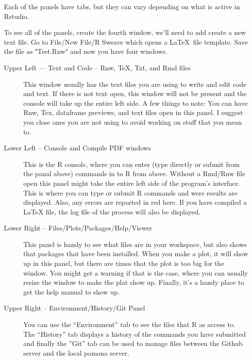 \documentclass[12pt]{../SOP4_alpha}\usepackage[]{graphicx}\usepackage[]{color}
\begin{document}
\NP Each of the panels have tabs, but they can vary depending on what is active in Rstudio. 

\NP To see all of the panels, create the fourth window, we'll need to add create a new text file. Go to File/New File/R Sweave which opens a \LaTeX\ file template. Save the file as "Test.Rnw" and now you have four windows.

\begin{description}
  \item[Upper Left --- Text and Code -- Rnw, \TeX, Txt, and Rmd files] This window usually has the text files you are using to write and edit code and text. If there is not text open, this window will not be present and the console will take up the entire left side. A few things to note: You can have Rnw, Tex, dataframe previews, and text files open in this panel. I suggest you close ones you are not using to avoid working on stuff that you mean to.  
  
  \item[Lower Left -- Console and Compile PDF windows] This is the R console, where you can enter (type directly or submit from the panal above) commands in to R from above. Without a Rmd/Rnw file open this panel might take the entire left side of the program's interface. This is where you can type or submit R commands and were results are displayed. Also, any errors are reported in red here. If you have compiled a LaTeX file, the log file of the process will also be displayed.
  
  \item[Lower Right -- Files/Plots/Packages/Help/Viewer] This panel is handy to see what files are in your workspace, but also shows that packages that have been installed. When you make a plot, it will show up in this panel, but there are times that the plot is too big for the window. You might get a warning if that is the case, where you can usually resize the window to make the plat show up. Finally, it's a handy place to get the help manual to show up. 

  \item[Upper Right -- Environment/History/Git Panel] You can use the ``Environment'' tab to see the files that R as access to. The ``History'' tab displays a history of the commands you have submitted and finally the ''Git'' tab can be used to manage files between the Github server and the local pomona server. 
  
\end{description}
\end{document}
